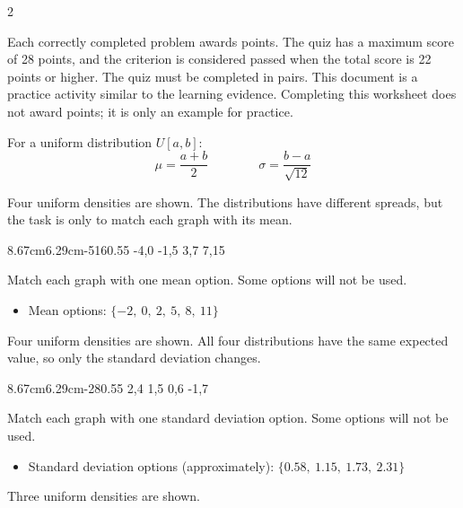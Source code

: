 	\begin{multicols}{2}
		
		\vspace{-0.35cm}
		
		Each correctly completed problem awards points. The quiz has a maximum score of 28 points, and the criterion is considered passed when the total score is 22 points or higher. The quiz must be completed in pairs. This document is a practice activity similar to the learning evidence. Completing this worksheet does not award points; it is only an example for practice.
		
		\vspace{-0.35cm}
		For a uniform distribution $U[a,b]$:
		\[
		\mu=\frac{a+b}{2}
		\qquad \qquad
		\sigma=\frac{b-a}{\sqrt{12}}
		\]
		
		\vspace{-0.35cm}
		Four uniform densities are shown. The distributions have different spreads, but the task is only to match each graph with its mean.
		
		\vspace{-0.7cm}
		\UniformFourGraph
		{8.67cm}{6.29cm}{-5}{16}{0.55}
		{-4,0}
		{-1,5}
		{3,7}
		{7,15}
		
		Match each graph with one mean option. Some options will not be used.
		\begin{itemize}
			\item Mean options: $\{-2,\ 0,\ 2,\ 5,\ 8,\ 11\}$
		\end{itemize}
		
		\vspace{-0.35cm}
		Four uniform densities are shown. All four distributions have the same expected value, so only the standard deviation changes.
		
		\vspace{-0.7cm}
		\UniformFourGraph
		{8.67cm}{6.29cm}{-2}{8}{0.55}
		{2,4}
		{1,5}
		{0,6}
		{-1,7}
		
		Match each graph with one standard deviation option. Some options will not be used.
		\begin{itemize}
			\item Standard deviation options (approximately): $\{0.58,\ 1.15,\ 1.73,\ 2.31\}$
		\end{itemize}
		
		\vspace{-0.35cm}
		Three uniform densities are shown.
		

\end{multicols}

